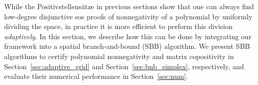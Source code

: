\documentclass[12pt]{article}
\theoremstyle{remark}
\begin{document}
While the Positivstellens\"atze in previous sections show that one can always find low-degree disjunctive sos proofs of nonnegativity of a polynomial by uniformly dividing the space, in practice it is more efficient to perform this division \emph{adaptively}. In this section, we describe how this can be done by integrating our framework into a spatial branch-and-bound (SBB) algorithm.
We present SBB algorithms to certify polynomial nonnegativity and matrix copositivity in Section~\ref{sec:adaptive_grid} and Section~\ref{sec:bnb_simplex}, respectively, and evaluate their numerical performance in Section~\ref{sec:num}. 


\end{document}
